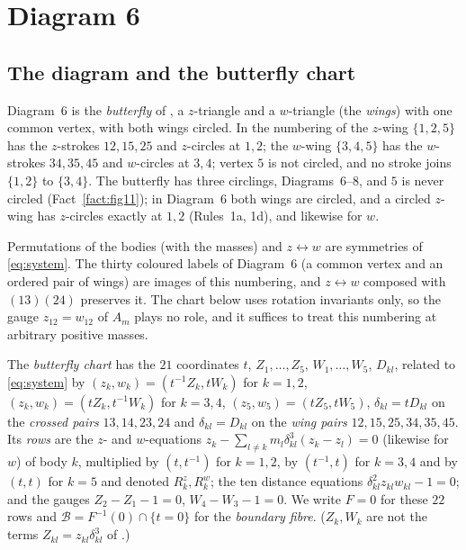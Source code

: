 \section{Diagram 6}\label{sec:d6}

\subsection{The diagram and the butterfly chart}

Diagram~6 is the \emph{butterfly} of \cite[\S7.4]{AK}, a $z$-triangle and a $w$-triangle (the
\emph{wings}) with one common vertex, with both wings circled.  In the numbering of
\cite[\S8.6]{AK} the $z$-wing $\{1,2,5\}$ has the $z$-strokes $12,15,25$ and $z$-circles at $1,2$;
the $w$-wing $\{3,4,5\}$ has the $w$-strokes $34,35,45$ and $w$-circles at $3,4$; vertex $5$ is
not circled, and no stroke joins $\{1,2\}$ to $\{3,4\}$.
The butterfly has three circlings, Diagrams~6--8, and $5$ is never circled
\cite[\S7.4]{AK} (Fact~\ref{fact:fig11}); in Diagram~6 both wings are circled, and a circled
$z$-wing has $z$-circles exactly at $1,2$ (Rules~1a, 1d), and likewise for $w$.

Permutations of the bodies (with the masses) and $z\leftrightarrow w$ are symmetries of
\eqref{eq:system}.  The thirty coloured labels of Diagram~6 (a common vertex and an ordered pair
of wings) are images of this numbering, and $z\leftrightarrow w$ composed with $(13)(24)$
preserves it.  The chart below uses rotation invariants only, so the gauge $z_{12}=w_{12}$ of
$A_m$ plays no role, and it suffices to treat this numbering at arbitrary positive masses.

\begin{definition}\label{d6-def-chart}
The \emph{butterfly chart} has the $21$ coordinates $t$, $Z_1,\dots,Z_5$, $W_1,\dots,W_5$,
$D_{kl}$, related to \eqref{eq:system} by $(z_k,w_k)=(t^{-1}Z_k,tW_k)$ for $k=1,2$,
$(z_k,w_k)=(tZ_k,t^{-1}W_k)$ for $k=3,4$, $(z_5,w_5)=(tZ_5,tW_5)$, $\delta_{kl}=tD_{kl}$ on the
\emph{crossed pairs} $13,14,23,24$ and $\delta_{kl}=D_{kl}$ on the \emph{wing pairs}
$12,15,25,34,35,45$.  Its \emph{rows} are the $z$- and $w$-equations
$z_k-\sum_{l\ne k}m_l\delta_{kl}^3(z_k-z_l)=0$ (likewise for $w$) of body $k$, multiplied by
$(t,t^{-1})$ for $k=1,2$, by $(t^{-1},t)$ for $k=3,4$ and by $(t,t)$ for $k=5$ and denoted
$R^z_k,R^w_k$; the ten distance equations $\delta_{kl}^2z_{kl}w_{kl}-1=0$; and the gauges
$Z_2-Z_1-1=0$, $W_4-W_3-1=0$.  We write $F=0$ for these $22$ rows and
$\mathcal B=F^{-1}(0)\cap\{t=0\}$ for the \emph{boundary fibre}.  ($Z_k,W_k$ are not the terms
$Z_{kl}=z_{kl}\delta_{kl}^3$ of \cite[\S3]{AK}.)
\end{definition}

